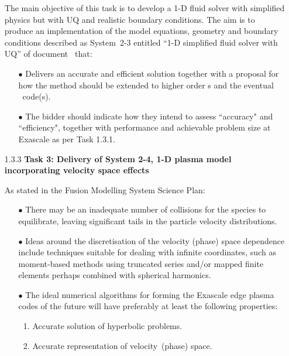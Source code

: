 \begin{itemize}
The main objective of this task is to develop a 1-D fluid solver with simplified 
physics but with UQ and realistic boundary conditions. The aim is to produce an 
implementation of the model equations, geometry and boundary conditions described 
as System~2-3 entitled ``1-D simplified fluid solver with UQ'' of document~\cite{pappeqs} 
that: 

\begin{itemize}
\item[$\bullet$] Delivers an accurate and efficient solution together with a proposal for 
how the method should be extended to higher order \Papp s and the eventual \nep \   
code(s). 

\item[$\bullet$] The bidder should indicate how they intend to assess ``accuracy" and ``efficiency",
together with performance and achievable problem size at Exascale as per Task 1.3.1.

\end{itemize}

\item[1.3.3]\textbf{Task 3: Delivery of System 2-4, 1-D plasma model incorporating velocity
space effects}

As stated in the Fusion Modelling System Science Plan: 

\begin{itemize}
\item[$\bullet$] There may be an inadequate number of collisions for the species to equilibrate, 
leaving significant tails in the particle velocity distributions. 

\item[$\bullet$] Ideas around the discretisation of the velocity (phase) space dependence 
include techniques suitable for dealing with infinite coordinates, such as moment-based 
methods using truncated series and/or mapped finite elements perhaps combined with 
spherical harmonics. 

\item[$\bullet$] The ideal numerical algorithms for forming the Exascale edge plasma codes 
of the future will have preferably at least the following properties: 

\begin{enumerate}
\item Accurate solution of hyperbolic problems. 
\item Accurate representation of velocity~(phase) space. 
\end{enumerate}


\end{itemize}
\end{itemize}
